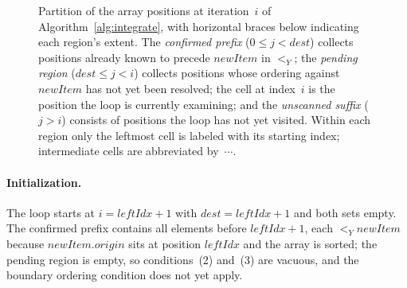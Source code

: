 \documentclass[sigplan,screen]{acmart}
\newcommand{\YjsLt}{\mathrel{<_Y}}
\begin{document}
\begin{figure}[t]
\centering
{}
\caption{Partition of the array positions at iteration~$i$ of
  Algorithm~\ref{alg:integrate}, with horizontal braces below
  indicating each region's extent.  The
  \emph{confirmed prefix} ($0 \leq j < \mathit{dest}$) collects
  positions already known to precede $\mathit{newItem}$ in
  $\YjsLt$; the \emph{pending region}
  ($\mathit{dest} \leq j < i$) collects positions whose ordering
  against $\mathit{newItem}$ has not yet been resolved; the cell
  at index~$i$ is the position the loop is currently examining;
  and the \emph{unscanned suffix} ($j > i$) consists of positions
  the loop has not yet visited.  Within each region only the
  leftmost cell is labeled with its starting index; intermediate
  cells are abbreviated by~$\cdots$.}
\label{fig:loop-partition}
\end{figure}

\paragraph{Initialization.}
The loop starts at $i = \mathit{leftIdx} + 1$ with
$\mathit{dest} = \mathit{leftIdx} + 1$ and both sets empty.  The
confirmed prefix contains all elements before $\mathit{leftIdx} + 1$,
each $\YjsLt \mathit{newItem}$ because
$\mathit{newItem}.\mathit{origin}$ sits at position $\mathit{leftIdx}$
and the array is sorted; the pending region is empty, so conditions~(2)
and~(3) are vacuous, and the boundary ordering condition does not yet
apply.
\end{document}

